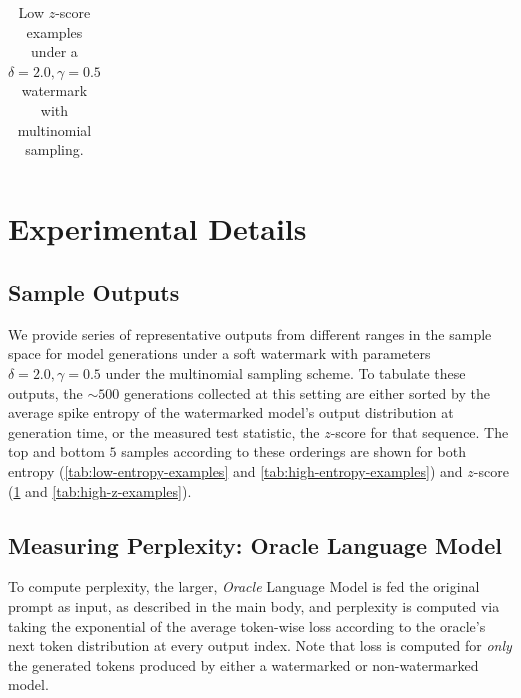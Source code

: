 \documentclass{article}
\theoremstyle{plain}
\theoremstyle{definition}
\theoremstyle{remark}
\begin{document}
\begin{table}[t]
\begin{tabular}{p{0.2cm}|p{2.75cm}|p{2.75cm}|p{2.75cm}|p{2.75cm}|p{0.2cm}|p{0.42cm}|p{0.42cm}|p{0.3cm}|p{0.3cm}}
\bottomrule
\end{tabular}
\caption{Low $z$-score examples under a $\delta=2.0,\gamma=0.5$ watermark with multinomial sampling.}\label{tab:low-z-examples}
\end{table}


\section{Experimental Details}

\subsection{Sample Outputs}\label{sec:sample-outputs}

We provide series of representative outputs from different ranges in the sample space for model generations under a soft watermark with parameters $\delta=2.0,\gamma=0.5$ under the multinomial sampling scheme. To tabulate these outputs, the $\sim 500$ generations collected at this setting are either sorted by the average spike entropy of the watermarked model's output distribution at generation time, or the measured test statistic, the $z$-score for that sequence. The top and bottom $5$ samples according to these orderings are shown for both entropy (\cref{tab:low-entropy-examples} and \cref{tab:high-entropy-examples}) and $z$-score (\cref{tab:low-z-examples} and \cref{tab:high-z-examples}).


\subsection{Measuring Perplexity: Oracle Language Model}\label{sec:measuring-ppl}

To compute perplexity, the larger, \textit{Oracle} Language Model is fed the original prompt as input, as described in the main body, and perplexity is computed via taking the exponential of the average token-wise loss according to the oracle's next token distribution at every output index. Note that loss is computed for \textit{only} the generated tokens produced by either a watermarked or non-watermarked model. 
\end{document}
